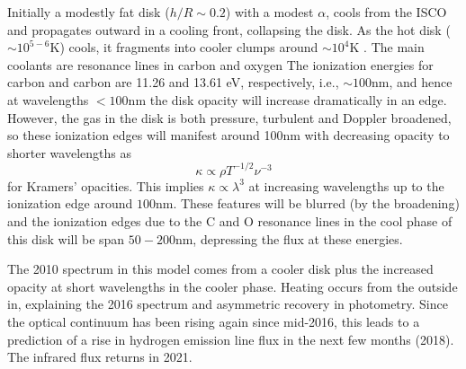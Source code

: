 \documentclass[11pt,a4paper]{article}
\begin{document}
Initially a modestly fat disk ($h/R \sim 0.2$) with a modest $\alpha$,
cools from the ISCO and propagates outward in a cooling front,
collapsing the disk. As the hot disk ($\sim 10^{5-6}$K) cools, it
fragments into cooler clumps around $\sim 10^{4}$K \citep[see e.g.,
][]{McCourt2016}.  The main coolants are resonance lines in carbon and
oxygen \citep[see e.g., Fig. 18 in ][]{Sutherland_Dopita1993} The
ionization energies for carbon and carbon are 11.26 and 13.61 eV,
respectively, i.e., $\sim 100$nm, and hence at wavelengths $<100$nm
the disk opacity will increase dramatically in an edge. %
However, the
gas in the disk is both pressure, turbulent and Doppler broadened, so
these ionization edges will manifest around 100nm with decreasing
opacity to shorter wavelengths as
\begin{equation}
  \kappa \propto \rho T^{-1/2} \nu^{-3}
\end{equation}
for Kramers' opacities. This implies $\kappa \propto \lambda^{3}$
at increasing wavelengths up to the ionization edge around $100$nm.
These features will be blurred (by the broadening) and the ionization
edges due to the C and O resonance lines in the cool phase of this
disk will be span $50-200$nm, depressing the flux at these energies.

The 2010 spectrum in this model comes from a cooler disk plus the
increased opacity at short wavelengths in the cooler phase. Heating
occurs from the outside in, explaining the 2016 spectrum and
asymmetric recovery in photometry.  Since the
optical continuum has been rising again since mid-2016, this leads to
a prediction of a rise in hydrogen emission line flux in the next few
months (2018). The infrared flux returns in 2021. 
\end{document}
